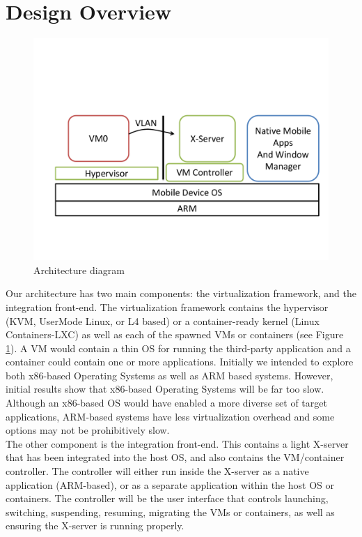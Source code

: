 \section{Design Overview}
\label{sec:overview}

\begin{figure}[tb]
\centering
\includegraphics[width=1.5\columnwidth]{arch}
\caption{Architecture diagram}
\label{fig:arch}
\end{figure}

\label{sec:proposedarch}
Our architecture has two main components: the virtualization framework, and the integration front-end.  The virtualization framework contains the hypervisor (KVM, UserMode Linux, or L4 based) or a container-ready kernel (Linux Containers-LXC) as well as each of the spawned VMs or containers (see Figure \ref{fig:arch}).  A VM would contain a thin OS for running the third-party application and a container could contain one or more applications.  Initially we intended to explore both x86-based Operating Systems as well as ARM based systems.  However, initial results show that x86-based Operating Systems will be far too slow.  Although an x86-based OS would have enabled a more diverse set of target applications, ARM-based systems have less virtualization overhead and some options may not be prohibitively slow. \\

The other component is the integration front-end. This contains a light X-server that has been integrated into the host OS, and also contains the VM/container controller. The controller will either run inside the X-server as a native application (ARM-based), or as a separate application within the host OS or containers. The controller will be the user interface that controls launching, switching, suspending, resuming, migrating the VMs or containers, as well as ensuring the X-server is running properly. %

